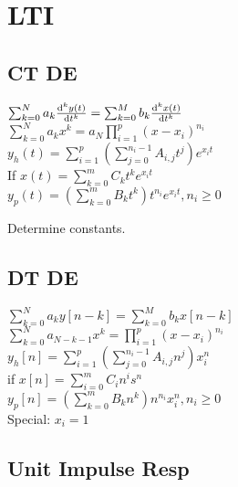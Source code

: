\section{LTI}
\subsection*{CT DE}
$\sum_{k=0}^{N}a_k\frac{\mathrm{d}^k y(t)}{\mathrm{d} t^k}=\sum_{k=0}^{M} b_k\frac{\mathrm{d}^k x(t)}{\mathrm{d} t^k}$\\
$\sum_{k=0}^{N} a_k x^k = a_N \prod_{i=1}^p (x-x_i)^{n_i}$\\
$y_h(t) = \sum_{i=1}^{p} (\sum_{j=0}^{n_i-1} A_{i,j} t^j) e^{x_it}$\\
If $x(t)=\sum_{k=0}^{m} C_kt^ke^{x_i t}$\\
$y_p(t)=(\sum_{k=0}^{m} B_kt^k)t^{n_i} e^{x_it}, n_i\ge 0$

Determine constants.
\subsection*{DT DE}
$\sum_{k=0}^{N} a_k y[n-k] = \sum_{k=0}^{M} b_k x[n-k]$\\ 
$\sum_{k=0}^N a_{N-k-1} x^k = \prod_{i=1}^p (x-x_i)^{n_i}$\\
$y_h[n] = \sum_{i=1}^{p} (\sum_{j=0}^{n_i-1} A_{i,j} n^j) x_i^{n}$\\
if $x[n] = \sum_{i=0}^m C_i n^i s^n$\\
$y_p[n]=(\sum_{k=0}^{m} B_kn^k)n^{n_i}x_i^n , n_i\ge 0$\\
Special: $x_i=1$
\subsection*{Unit Impulse Resp}